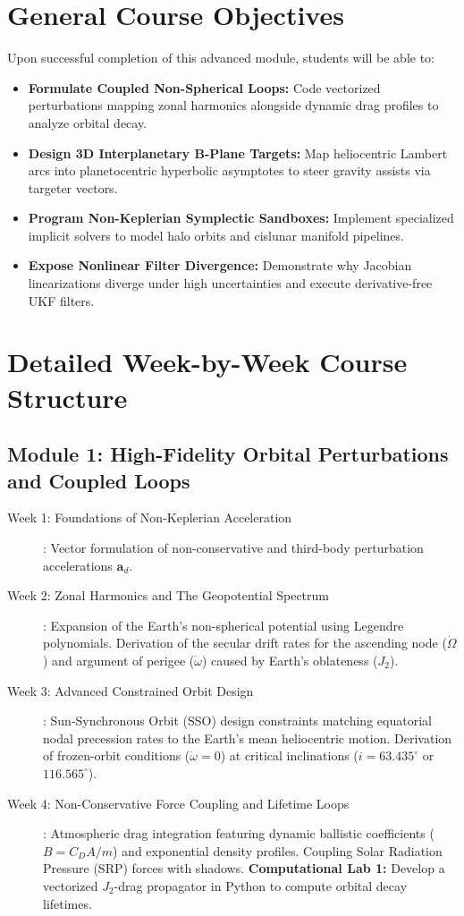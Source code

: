 \documentclass[11pt, letterpaper]{article}
\begin{document}
\section{General Course Objectives}
Upon successful completion of this advanced module, students will be able to:
\begin{itemize}
    \item \textbf{Formulate Coupled Non-Spherical Loops:} Code vectorized perturbations mapping zonal harmonics alongside dynamic drag profiles to analyze orbital decay.
    \item \textbf{Design 3D Interplanetary B-Plane Targets:} Map heliocentric Lambert arcs into planetocentric hyperbolic asymptotes to steer gravity assists via targeter vectors.
    \item \textbf{Program Non-Keplerian Symplectic Sandboxes:} Implement specialized implicit solvers to model halo orbits and cislunar manifold pipelines.
    \item \textbf{Expose Nonlinear Filter Divergence:} Demonstrate why Jacobian linearizations diverge under high uncertainties and execute derivative-free UKF filters.
\end{itemize}

\section{Detailed Week-by-Week Course Structure}

\subsection*{Module 1: High-Fidelity Orbital Perturbations and Coupled Loops}
\begin{description}
    \item[Week 1: Foundations of Non-Keplerian Acceleration]: Vector formulation of non-conservative and third-body perturbation accelerations $\mathbf{a}_d$. 
    
    \item[Week 2: Zonal Harmonics and The Geopotential Spectrum]: Expansion of the Earth's non-spherical potential using Legendre polynomials. Derivation of the secular drift rates for the ascending node ($\dot{\Omega}$) and argument of perigee ($\dot{\omega}$) caused by Earth's oblateness ($J_2$).
    
    \item[Week 3: Advanced Constrained Orbit Design]: Sun-Synchronous Orbit (SSO) design constraints matching equatorial nodal precession rates to the Earth's mean heliocentric motion. Derivation of frozen-orbit conditions ($\dot{\omega} = 0$) at critical inclinations ($i = 63.435^\circ$ or $116.565^\circ$).
    
    \item[Week 4: Non-Conservative Force Coupling and Lifetime Loops]: Atmospheric drag integration featuring dynamic ballistic coefficients ($B = C_D A / m$) and exponential density profiles. Coupling Solar Radiation Pressure (SRP) forces with shadows.
    \textbf{Computational Lab 1:} Develop a vectorized $J_2$-drag propagator in Python to compute orbital decay lifetimes.
\end{description}
\end{document}

